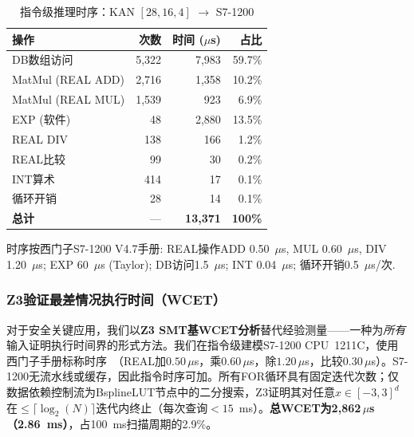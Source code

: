 \documentclass[journal,onecolumn]{IEEEtran}
\theoremstyle{definition}
\theoremstyle{plain}
\theoremstyle{remark}
\begin{document}
\begin{table}[!t]
\centering
\caption{指令级推理时序：KAN $[28,16,4]$ $\to$ S7-1200}
\label{tab:instr_timing}
\footnotesize
\begin{tabular}{@{}lrrr@{}}
\toprule
\textbf{操作} & \textbf{次数} & \textbf{时间 ($\mu$s)} & \textbf{占比} \\
\midrule
DB数组访问      & 5,322 & 7,983 & 59.7\% \\
MatMul (REAL ADD) & 2,716 & 1,358 & 10.2\% \\
MatMul (REAL MUL) & 1,539 &   923 &  6.9\% \\
EXP (软件)       & 48    & 2,880 & 13.5\% \\
REAL DIV        & 138   &   166 &  1.2\%  \\
REAL比较        & 99    &    30 &  0.2\%  \\
INT算术          & 414   & 17    & 0.1\%  \\
循环开销        & 28    & 14    & 0.1\%  \\
\midrule
\textbf{总计}   & ---   & \textbf{13,371} & \textbf{100\%} \\
\bottomrule
\end{tabular}
\vspace{1pt}
{\scriptsize 时序按西门子S7-1200 V4.7手册: REAL操作ADD 0.50~$\mu$s, MUL 0.60~$\mu$s, DIV 1.20~$\mu$s; EXP 60~$\mu$s (Taylor); DB访问1.5~$\mu$s; INT 0.04~$\mu$s; 循环开销0.5~$\mu$s/次.}
\end{table}

\subsubsection{Z3验证最差情况执行时间（WCET）}

对于安全关键应用，我们以\textbf{Z3 SMT基WCET分析}替代经验测量——一种为\textit{所有}输入证明执行时间界的形式方法。我们在指令级建模S7-1200 CPU~1211C，使用西门子手册标称时序~\cite{siemens_s7_1200_2022}（REAL加$0.50\,\mu$s，乘$0.60\,\mu$s，除$1.20\,\mu$s，比较$0.30\,\mu$s）。S7-1200无流水线或缓存，因此指令时序可加。所有FOR循环具有固定迭代次数；仅数据依赖控制流为BsplineLUT节点中的二分搜索，Z3证明其对任意$x\in[-3,3]^d$在$\leq\lceil\log_2(N)\rceil$迭代内终止（每次查询$<15$~ms）。\textbf{总WCET为2,862\,$\mu$s（2.86~ms）}，占100~ms扫描周期的2.9\%。
\end{document}
